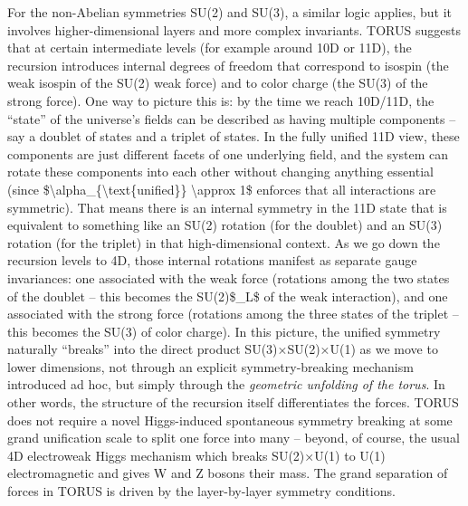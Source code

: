 \documentclass[]{article}
\begin{document}
For the non-Abelian symmetries SU(2) and SU(3), a similar logic applies,
but it involves higher-dimensional layers and more complex invariants.
TORUS suggests that at certain intermediate levels (for example around
10D or 11D), the recursion introduces internal degrees of freedom that
correspond to isospin (the weak isospin of the SU(2) weak force) and to
color charge (the SU(3) of the strong force). One way to picture this
is: by the time we reach 10D/11D, the ``state'' of the universe's fields
can be described as having multiple components -- say a doublet of
states and a triplet of states. In the fully unified 11D view, these
components are just different facets of one underlying field, and the
system can rotate these components into each other without changing
anything essential (since
\$\textbackslash{}alpha\_\{\textbackslash{}text\{unified\}\}
\textbackslash{}approx 1\$ enforces that all interactions are
symmetric). That means there is an internal symmetry in the 11D state
that is equivalent to something like an SU(2) rotation (for the doublet)
and an SU(3) rotation (for the triplet) in that high-dimensional
context. As we go down the recursion levels to 4D, those internal
rotations manifest as separate gauge invariances: one associated with
the weak force (rotations among the two states of the doublet -- this
becomes the SU(2)\$\_L\$ of the weak interaction), and one associated
with the strong force (rotations among the three states of the triplet
-- this becomes the SU(3) of color charge). In this picture, the unified
symmetry naturally ``breaks'' into the direct product SU(3)×SU(2)×U(1)
as we move to lower dimensions, not through an explicit
symmetry-breaking mechanism introduced ad hoc, but simply through the
\emph{geometric unfolding of the torus}. In other words, the structure
of the recursion itself differentiates the forces. TORUS does not
require a novel Higgs-induced spontaneous symmetry breaking at some
grand unification scale to split one force into many -- beyond, of
course, the usual 4D electroweak Higgs mechanism which breaks SU(2)×U(1)
to U(1) electromagnetic and gives W and Z bosons their mass. The grand
separation of forces in TORUS is driven by the layer-by-layer symmetry
conditions.
\end{document}
